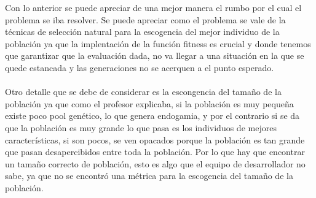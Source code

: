 \documentclass[10pt,a4paper]{article}
\begin{document}
Con lo anterior se puede apreciar de una mejor manera el rumbo por el cual el problema se iba resolver. 
Se puede apreciar como el problema se vale de la técnicas de selección natural para la escogencia del mejor individuo de la población ya que la implentación de la función fitness es crucial y donde tenemos que garantizar que la evaluación dada, no va llegar a una situación en la que se quede estancada y las generaciones no se acerquen a el punto esperado.\\\\
Otro detalle que se debe de considerar es la escongencia del tamaño de la población ya que como el profesor explicaba, si la población es muy pequeña existe poco pool genético, lo que genera endogamia, y por el contrario si se da que la población es  muy grande lo que pasa es los individuos de mejores características, si son pocos, se ven opacados porque la población es tan grande que pasan desapercibidos entre toda la población. Por lo que hay que encontrar un tamaño correcto de población, esto es algo que el equipo de desarrollador no sabe, ya que no se encontró una métrica para la escogencia del tamaño de la población.\\\
\pagebreak
\end{document}
